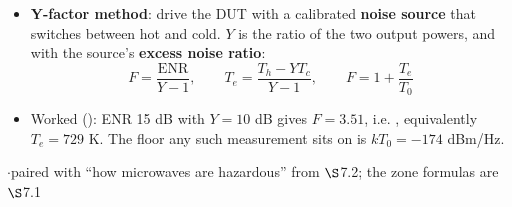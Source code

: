\par{}
\begin{itemize}
  \item \textbf{Y-factor method}: drive the DUT with a calibrated \textbf{noise source} that
    switches between hot and cold. $Y$ is the ratio of the two output powers, and with the
    source's \textbf{excess noise ratio}:
    \[ F = \frac{\mathrm{ENR}}{Y-1}, \qquad T_e = \frac{T_h - YT_c}{Y-1},
       \qquad F = 1 + \frac{T_e}{T_0} \]
  \item Worked (): ENR 15 dB with $Y = 10$ dB gives $F = 3.51$, i.e.
    , equivalently $T_e = 729$ K. The floor any such measurement sits on is
    $kT_0 = -174$ dBm/Hz.
\end{itemize}

\vspace{2pt}


{\color{sub}\footnotesize {}  \gap$\cdot$\gap paired with ``how microwaves are hazardous''  from $\S$7.2; the zone formulas are $\S$7.1}

